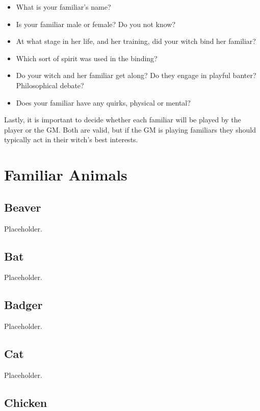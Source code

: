 \begin{itemize}
	\item What is your familiar's name?
	\item Is your familiar male or female?
		Do you not know?
	\item At what stage in her life, and her training, did your witch bind her familiar?
	\item Which sort of spirit was used in the binding? %
	\item Do your witch and her familiar get along?
		Do they engage in playful banter?
		Philosophical debate?
	\item Does your familiar have any quirks, physical or mental?
\end{itemize}

Lastly, it is important to decide whether each familiar will be played by the player or the GM.
Both are valid, but if the GM is playing familiars they should typically act in their witch's best interests.

\section{Familiar Animals}

\subsection{Beaver}

Placeholder.

\subsection{Bat}

Placeholder.

\subsection{Badger}

Placeholder.

\subsection{Cat}

Placeholder.

\subsection{Chicken}

